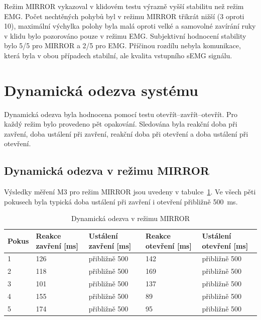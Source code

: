 \documentclass[FZS,DP]{tulthesis}
\begin{document}
Režim MIRROR vykazoval v klidovém testu výrazně vyšší stabilitu než režim EMG\@. Počet nechtěných pohybů byl v režimu MIRROR třikrát nižší (3 oproti 10), maximální výchylka polohy byla malá oproti velké a samovolné zavírání ruky v klidu bylo pozorováno pouze v režimu EMG\@. Subjektivní hodnocení stability bylo 5/5 pro MIRROR a 2/5 pro EMG\@. Příčinou rozdílu nebyla komunikace, která byla v obou případech stabilní, ale kvalita vstupního sEMG signálu.

\section{Dynamická odezva systému}
\label{sec:dynamicka-odezva}

Dynamická odezva byla hodnocena pomocí testu otevřít--zavřít--otevřít. Pro každý režim bylo provedeno pět opakování. Sledována byla reakční doba při zavření, doba ustálení při zavření, reakční doba při otevření a doba ustálení při otevření.

\subsection{Dynamická odezva v režimu MIRROR}
\label{subsec:dynamika-mirror}

Výsledky měření M3 pro režim MIRROR jsou uvedeny v tabulce~\ref{tab:mirror-otevrit-zavrit}. Ve všech pěti pokusech byla typická doba ustálení při zavření i otevření přibližně 500~ms.

\begin{table}[H]
\centering
\caption{Dynamická odezva v režimu MIRROR}
\label{tab:mirror-otevrit-zavrit}
\begin{tabular}{|p{}|p{}|p{}|p{}|p{}|}
\hline
\textbf{Pokus} & \textbf{Reakce zavření [ms]} & \textbf{Ustálení zavření [ms]} & \textbf{Reakce otevření [ms]} & \textbf{Ustálení otevření [ms]} \\
\hline
1 & 126 & přibližně 500 & 142 & přibližně 500 \\
\hline
2 & 118 & přibližně 500 & 169 & přibližně 500 \\
\hline
3 & 101 & přibližně 500 & 137 & přibližně 500 \\
\hline
4 & 155 & přibližně 500 & 89 & přibližně 500 \\
\hline
5 & 174 & přibližně 500 & 95 & přibližně 500 \\
\hline
\end{tabular}
\end{table}
\end{document}
